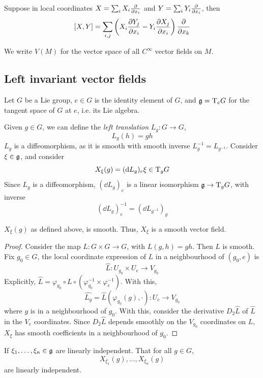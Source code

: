 \documentclass{article}
\begin{document}
\lec

Suppose in local coordinates \(X = \sum_i X_i \pdv{x_i}\) and \(Y = \sum_i Y_i \pdv{x_i}\), then
\[[X, Y] = \sum_{i, j}\left(X_i \pdv{Y_j}{x_i} - Y_i \pdv{X_j}{x_i}\right)\pdv{x_k}\]

\begin{notation}
    We write \(V(M)\) for the vector space of all \(C^\infty\) vector fields on \(M\).
\end{notation}

\subsection{Left invariant vector fields}

Let \(G\) be a Lie group, \(e \in G\) is the identity element of \(G\), and \(\mathfrak{g} = \mathrm{T}_eG\) for the tangent space of \(G\) at \(e\), i.e. its Lie algebra.

Given \(g \in G\), we can define the \emph{left translation} \(L_g : G \to G\),
\[L_g(h) = gh\]
\(L_g\) is a diffeomorphism, as it is smooth with smooth inverse \(L_g^{-1} = L_{g^{-1}}\). Consider \(\xi \in \mathfrak{g}\), and consider 
\[X_\xi(g) = (\dd L_g)_e\xi \in \mathrm{T}_gG\]
Since \(L_g\) is a diffeomorphism, \((\dd L_g)_e\) is a linear isomorphism \(\mathfrak{g} \to \mathrm{T}_gG\), with inverse
\[(\dd L_g)_e^{-1} = (\dd L_{g^{-1}})_g\]

\begin{lemma}
    \(X_\xi(g)\) as defined above, is smooth. Thus, \(X_\xi\) is a smooth vector field.
\end{lemma}

\begin{proof}
    Consider the map \(L : G \times G \to G\), with \(L(g, h) = gh\). Then \(L\) is smooth. Fix \(g_0 \in G\), the local coordinate expression of \(L\) in a neighbourhood of \((g_0, e)\) is
    \[\widehat{L} : U_{g_0} \times U_e \to V_{g_0}\]
    Explicitly, \(\widehat L = \varphi_{g_0} \circ L \circ (\varphi_{g_0}^{-1} \times \varphi_e^{-1})\). With this,
    \[\widehat{L_g} = \widehat L(\varphi_{g_0}(g), \cdot) : U_e \to V_{g_0}\]
    where \(g\) is in a neighbourhood of \(g_0\). With this, consider the derivative \(D_2 \widehat{L}\) of \(\widehat{L}\) in the \(V_e\) coordinates. Since \(D_2\widehat{L}\) depends smoothly on the \(V_{g_0}\) coordinates on \(L\), \(X_\xi\) has smooth coefficients in a neighbourhood of \(g_0\).
\end{proof}

\begin{proposition}
    If \(\xi_1, \dots, \xi_n \in \mathfrak{g}\) are linearly independent. That for all \(g \in G\),
    \[X_{\xi_1}(g), \dots, X_{\xi_n}(g)\]
    are linearly independent.
\end{proposition}
\end{document}
